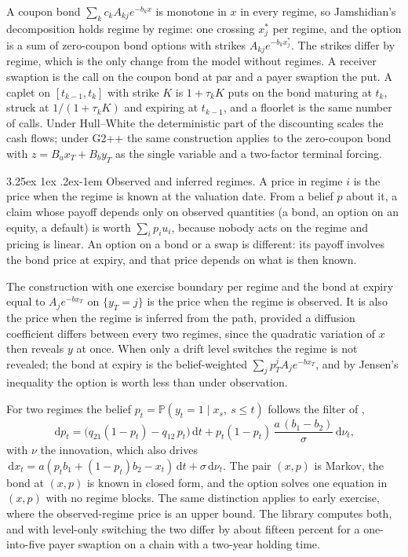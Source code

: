 \documentclass[11pt]{article}
\makeatletter
\renewcommand\paragraph{\@startsection{paragraph}{4}{\z@}%
  {3.25ex \@plus1ex \@minus.2ex}{-1em}%
  {\normalfont\normalsize\itshape}}
\theoremstyle{remark}
\newcommand{\dd}{\,\mathrm{d}}
\makeatother
\begin{document}
A coupon bond $\sum_k c_k A_{kj}e^{-b_k x}$ is monotone in $x$ in every regime, so Jamshidian's decomposition
\citep{jamshidian1989} holds regime by regime: one crossing $x^*_j$ per regime, and the option is a sum of
zero-coupon bond options with strikes $A_{kj}e^{-b_k x^*_j}$. The strikes differ by regime, which is the only
change from the model without regimes. A receiver swaption is the call on the coupon bond at par and a payer
swaption the put. A caplet on $[t_{k-1}, t_k]$ with strike $K$ is $1 + \tau_k K$ puts on the bond maturing at
$t_k$, struck at $1/(1 + \tau_k K)$ and expiring at $t_{k-1}$, and a floorlet is the same number of calls. Under
Hull--White the deterministic part of the discounting scales the cash flows; under G2++ the same construction
applies to the zero-coupon bond with $z = B_a x_T + B_b y_T$ as the single variable and a two-factor terminal
forcing.

\paragraph{Observed and inferred regimes.}
A price in regime $i$ is the price when the regime is known at the valuation date. From a belief $p$ about it, a
claim whose payoff depends only on observed quantities (a bond, an option on an equity, a default) is worth
$\sum_i p_i u_i$, because nobody acts on the regime and pricing is linear. An option on a bond or a swap is
different: its payoff involves the bond price at expiry, and that price depends on what is then known.

The construction with one exercise boundary per regime and the bond at expiry equal to $A_j e^{-b x_T}$ on
$\{y_T = j\}$ is the price when the regime is observed. It is also the price when the regime is inferred from the
path, provided a diffusion coefficient differs between every two regimes, since the quadratic variation of $x$ then
reveals $y$ at once. When only a drift level switches the regime is not revealed; the bond at expiry is the
belief-weighted $\sum_j p^j_T A_j e^{-b x_T}$, and by Jensen's inequality the option is worth less than under
observation.

For two regimes the belief $p_t = \mathbb{P}(y_t = 1 \mid x_s,\ s \le t)$ follows the filter of
\citet{wonham1965},
\[
  \dd p_t = \big(q_{21}(1 - p_t) - q_{12}\,p_t\big)\dd t + p_t(1 - p_t)\,\frac{a\,(b_1 - b_2)}{\sigma}\dd\nu_t,
\]
with $\nu$ the innovation, which also drives $\dd x_t = a(p_t b_1 + (1 - p_t)b_2 - x_t)\dd t + \sigma\dd\nu_t$. The
pair $(x, p)$ is Markov, the bond at $(x, p)$ is known in closed form, and the option solves one equation in
$(x, p)$ with no regime blocks. The same distinction applies to early exercise, where the observed-regime price is
an upper bound. The library computes both, and with level-only switching the two differ by about fifteen percent
for a one-into-five payer swaption on a chain with a two-year holding time.
\end{document}
